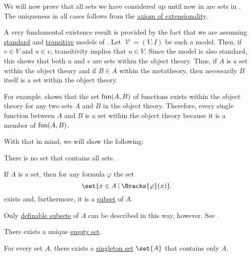 \begin{proposition}\label{thm:zfc_existence_theorems}
  We will now prove that all sets we have considered up until now in  are sets in \hyperref[def:zfc]{}. The uniqueness in all cases follows from the \hyperref[def:zfc/extensionality]{axiom of extensionality}.

  A very fundamental existence result is provided by the fact that we are assuming \hyperref[rem:standard_model_of_set_theory]{standard} and \hyperref[rem:transitive_model_of_set_theory]{transitive} models of . Let \( \mscrV = (V, I) \) be such a model. Then, if \( v \in V \) and \( u \in v \), transitivity implies that \( u \in V \). Since the model is also standard, this shows that both \( u \) and \( v \) are sets within the object theory. Thus, if \( A \) is a set within the object theory and if \( B \in A \) within the metatheory, then necessarily \( B \) itself is a set within the object theory.

  For example,  shows that the set \( \operatorname{fun}(A, B) \) of functions exists within the object theory for any two sets \( A \) and \( B \) in the object theory. Therefore, every single function between \( A \) and \( B \) is a set within the object theory because it is a member of \( \operatorname{fun}(A, B) \).

  With that in mind, we will show the following:

  \begin{thmenum}
     There is no set that contains all sets.

     If \( A \) is a set, then for any formula \( \varphi \) the set
    \begin{equation*}
      \set{ x \in A \given \Bracks{\varphi}(x) }.
    \end{equation*}
    exists and, furthermore, it is a \hyperref[def:subset]{subset} of \( A \).

    Only \hyperref[def:first_order_definability]{definable subsets} of \( A \) can be described in this way, however. See .

     There exists a unique \hyperref[def:empty_set]{empty set}.

     For every set \( A \), there exists a \hyperref[rem:singleton_sets]{singleton set} \( \set{ A } \) that contains only \( A \).


\end{thmenum}
\end{proposition}
